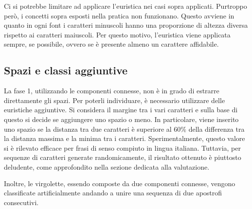 Ci si potrebbe limitare ad applicare l'euristica nei casi sopra applicati. Purtroppo però, i concetti sopra esposti nella pratica non funzionano. Questo avviene in quanto in ogni font i caratteri minuscoli hanno una proporzione di altezza diversa rispetto ai caratteri maiuscoli. Per questo motivo, l'euristica viene applicata sempre, se possibile, ovvero se è presente almeno un carattere affidabile.

\subsection{Spazi e classi aggiuntive}

La fase 1, utilizzando le componenti connesse, non è in grado di estrarre direttamente gli spazi. Per poterli individuare, è necessario utilizzare delle euristiche aggiuntive. Si considera il margine tra i vari caratteri e sulla base di questo si decide se aggiungere uno spazio o meno. In particolare, viene inserito uno spazio se la distanza tra due caratteri è superiore al 60\% della differenza tra la distanza massima e la minima tra i caratteri. Sperimentalmente, questo valore si è rilevato efficace per frasi di senso compiuto in lingua italiana. Tuttavia, per sequenze di caratteri generate randomicamente, il risultato ottenuto è piuttosto deludente, come approfondito nella sezione dedicata alla valutazione.

Inoltre, le virgolette, essendo composte da due componenti connesse, vengono classificate artificialmente andando a unire una sequenza di due apostrofi consecutivi.